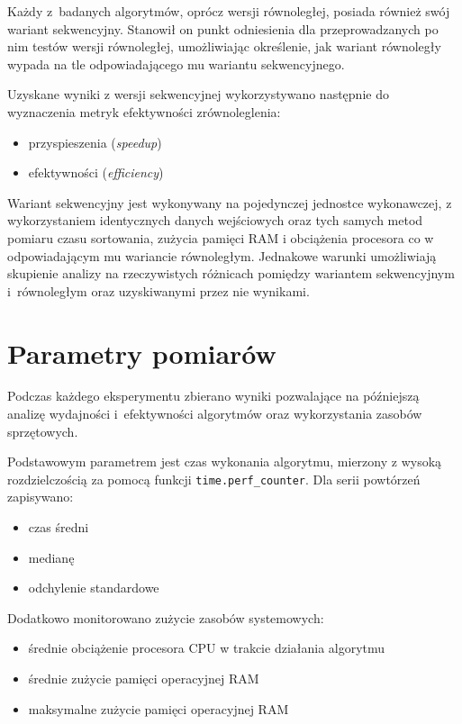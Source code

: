 Każdy z~badanych algorytmów, oprócz wersji równoległej, posiada również swój wariant sekwencyjny. 
Stanowił on punkt odniesienia dla przeprowadzanych po nim testów wersji równoległej, 
umożliwiając określenie, jak wariant równoległy wypada na tle odpowiadającego mu wariantu sekwencyjnego.

Uzyskane wyniki z wersji sekwencyjnej wykorzystywano następnie do wyznaczenia metryk efektywności zrównoleglenia:
\begin{itemize}
    \item przyspieszenia (\textit{speedup})
    \item efektywności (\textit{efficiency})
\end{itemize}

Wariant sekwencyjny jest wykonywany na pojedynczej jednostce wykonawczej, z wykorzystaniem identycznych danych wejściowych oraz tych samych 
metod pomiaru czasu sortowania, zużycia pamięci RAM i obciążenia procesora co w odpowiadającym mu wariancie równoległym. 
Jednakowe warunki umożliwiają skupienie analizy na rzeczywistych różnicach pomiędzy wariantem sekwencyjnym i~równoległym oraz uzyskiwanymi 
przez nie wynikami.

\section{Parametry pomiarów}
\label{sec:ParametryPomiarow}

Podczas każdego eksperymentu zbierano wyniki pozwalające na późniejszą analizę wydajności i~efektywności algorytmów 
oraz wykorzystania zasobów sprzętowych.

Podstawowym parametrem jest czas wykonania algorytmu, mierzony z wysoką rozdzielczością za pomocą funkcji \texttt{time.perf\_counter}. 
Dla serii powtórzeń zapisywano:
\begin{itemize}
    \item czas średni
    \item medianę
    \item odchylenie standardowe
\end{itemize}

Dodatkowo monitorowano zużycie zasobów systemowych:
\begin{itemize}
    \item średnie obciążenie procesora CPU w trakcie działania algorytmu
    \item średnie zużycie pamięci operacyjnej RAM
    \item maksymalne zużycie pamięci operacyjnej RAM
\end{itemize}


